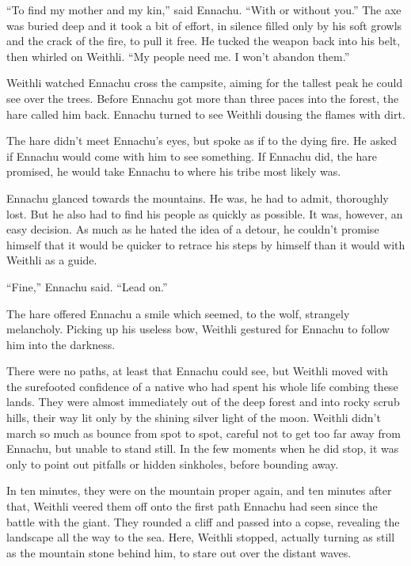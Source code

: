 ``To find my mother and my kin,'' said Ennachu. ``With or without you.'' The axe was buried deep and it took a bit of effort, in silence filled only by his soft growls and the crack of the fire, to pull it free. He tucked the weapon back into his belt, then whirled on Weithli. ``My people need me. I won't abandon them.''

Weithli watched Ennachu cross the campsite, aiming for the tallest peak he could see over the trees. Before Ennachu got more than three paces into the forest, the hare called him back. Ennachu turned to see Weithli dousing the flames with dirt.

The hare didn't meet Ennachu's eyes, but spoke as if to the dying fire. He asked if Ennachu would come with him to see something. If Ennachu did, the hare promised, he would take Ennachu to where his tribe most likely was.

Ennachu glanced towards the mountains. He was, he had to admit, thoroughly lost. But he also had to find his people as quickly as possible. It was, however, an easy decision. As much as he hated the idea of a detour, he couldn't promise himself that it would be quicker to retrace his steps by himself than it would with Weithli as a guide.

``Fine,'' Ennachu said. ``Lead on.''

The hare offered Ennachu a smile which seemed, to the wolf, strangely melancholy. Picking up his useless bow, Weithli gestured for Ennachu to follow him into the darkness.

There were no paths, at least that Ennachu could see, but Weithli moved with the surefooted confidence of a native who had spent his whole life combing these lands. They were almost immediately out of the deep forest and into rocky scrub hills, their way lit only by the shining silver light of the moon. Weithli didn't march so much as bounce from spot to spot, careful not to get too far away from Ennachu, but unable to stand still. In the few moments when he did stop, it was only to point out pitfalls or hidden sinkholes, before bounding away.

In ten minutes, they were on the mountain proper again, and ten minutes after that, Weithli veered them off onto the first path Ennachu had seen since the battle with the giant. They rounded a cliff and passed into a copse, revealing the landscape all the way to the sea. Here, Weithli stopped, actually turning as still as the mountain stone behind him, to stare out over the distant waves.


